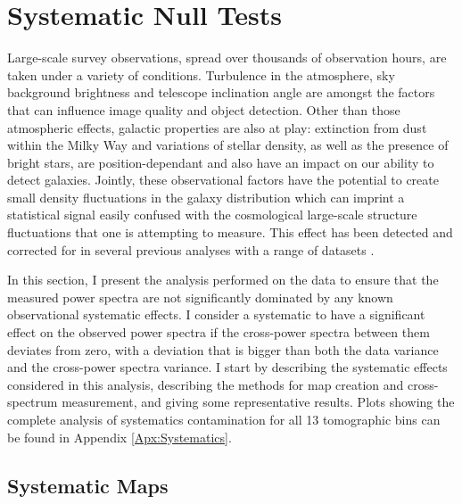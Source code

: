 \section{Systematic Null Tests}\label{Sec:Systm}
Large-scale survey observations, spread over thousands of observation hours, are taken under a variety of conditions. Turbulence in the atmosphere, sky background brightness and telescope inclination angle are amongst the factors that can influence image quality and object detection. Other than those atmospheric effects, galactic properties are also at play: extinction from dust within the Milky Way and variations of stellar density, as well as the presence of bright stars, are position-dependant and also have an impact on our ability to detect galaxies. Jointly, these observational factors have the potential to create small density fluctuations in the galaxy distribution which can imprint a statistical signal easily confused with the cosmological large-scale structure fluctuations that one is attempting to measure. This effect has been detected and corrected for in several previous analyses with a range of datasets \citep{Blake2007, 2011MNRAS.417.1350R, Thomas2011, Boris2013, Ho2012, Doux2017}.

\qquad In this section, I present the analysis performed on the data to ensure that the measured power spectra are not significantly dominated by any known observational systematic effects. I consider a systematic to have a significant effect on the observed power spectra if the cross-power spectra between them deviates from zero, with a deviation that is bigger than both the data variance and the cross-power spectra variance. I start by describing the systematic effects considered in this analysis, describing the methods for map creation and cross-spectrum measurement, and giving some representative results. Plots showing the complete analysis of systematics contamination for all 13 tomographic bins can be found in Appendix \ref{Apx:Systematics}.

\subsection{Systematic Maps}\label{Sec:SystMaps}

